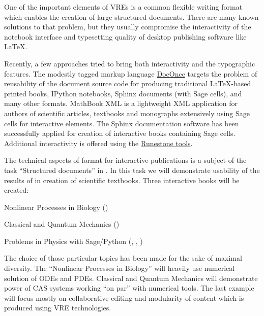 \begin{workpackage}
\begin{tasklist}
\begin{task}[title=Demonstrator: Interactive books,
id=ibook,lead=US,PM=30]
  
One of the important elements of VREs is a common flexible writing format which
enables the creation of large structured documents. There are many
known solutions to that problem, but they usually compromise the
interactivity of the notebook interface and typesetting quality of desktop
publishing software like LaTeX.

Recently, a few approaches tried to bring both interactivity and the
typographic features. The modestly tagged markup language
\href{http://hplgit.github.io/doconce/doc/web/}{DocOnce}
targets the problem of reusability of the document source code for
producing traditional LaTeX-based printed books, IPython notebooks, Sphinx
documents (with Sage cells), and many other formats. MathBook XML
is a lightweight XML application for authors of scientific articles,
textbooks and monographs extensively using Sage cells for
interactive elements. The Sphinx documentation software has been
successfully applied for creation of interactive books containing Sage
cells. Additional interactivity is offered using the \href{http://runestoneinteractive.org}{Runestone tools}.

The technical aspects of format for interactive publications is a
subject of the task ``Structured documents'' in
. In this task we will demonstrate usability
of the results of  in creation of scientific
textbooks. Three interactive books will be created:

\begin{compactitem}
\item Nonlinear Processes in Biology ()
\item Classical and Quantum Mechanics ()
\item Problems in Physics with Sage/Python (, , )
\end{compactitem}

The choice of those particular topics has been made for the sake of
maximal diversity. The ``Nonlinear Processes in Biology'' will heavily
use numerical solution of ODEs and PDEs.
Classical and Quantum Mechanics will demonstrate power of
CAS systems working ``on par'' with numerical tools. The last example
will focus mostly on collaborative editing and modularity of content
which is produced using VRE technologies.


\end{task}
\end{tasklist}
\end{workpackage}
